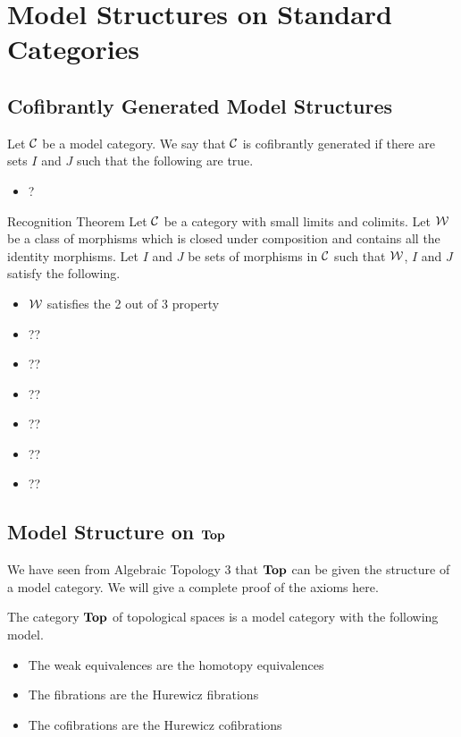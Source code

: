 \documentclass[a4paper]{article}
\begin{document}
\pagebreak
\section{Model Structures on Standard Categories}
\subsection{Cofibrantly Generated Model Structures}
\begin{defn}{}{} Let $\mathcal{C}$ be a model category. We say that $\mathcal{C}$ is cofibrantly generated if there are sets $I$ and $J$ such that the following are true. 
\begin{itemize}
\item ?
\end{itemize}
\end{defn}

\begin{thm}{Recognition Theorem}{} Let $\mathcal{C}$ be a category with small limits and colimits. Let $\mathcal{W}$ be a class of morphisms which is closed under composition and contains all the identity morphisms. Let $I$ and $J$ be sets of morphisms in $\mathcal{C}$ such that $\mathcal{W}$, $I$ and $J$ satisfy the following. 
\begin{itemize}
\item $\mathcal{W}$ satisfies the 2 out of 3 property
\item ??
\item ??
\item ??
\item ??
\item ??
\item ??
\end{itemize}
\end{thm}

\subsection{Model Structure on $\bold{Top}$}
We have seen from Algebraic Topology 3 that $\bold{Top}$ can be given the structure of a model category. We will give a complete proof of the axioms here. 

\begin{thm}{}{} The category $\bold{Top}$ of topological spaces is a model category with the following model. 
\begin{itemize}
\item The weak equivalences are the homotopy equivalences
\item The fibrations are the Hurewicz fibrations
\item The cofibrations are the Hurewicz cofibrations
\end{itemize}
\end{thm}
\end{document}
